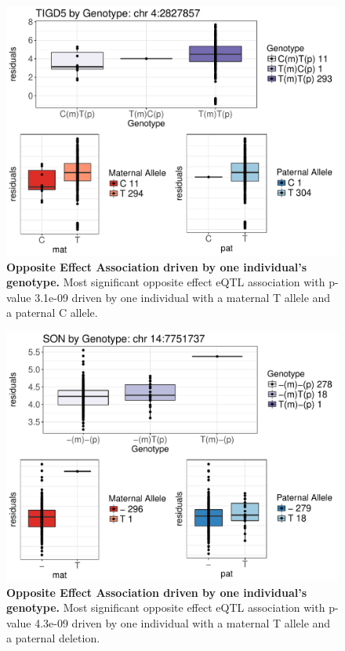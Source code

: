 \begin{figure}[!htb]
\centering \includegraphics[width=6in]{img/ch04/fig-01-oeQTL.pdf}
\caption[Opposite Effect Association driven by one individual's genotype.]{\textbf{Opposite Effect Association driven by one individual's genotype.} Most significant opposite effect eQTL association with p-value 3.1e-09 driven by one individual with a maternal T allele and a paternal C allele.}
\label{fig:oeQTL}
\end{figure}
\clearpage

\begin{figure}[!htb]
\centering \includegraphics[width=6in]{img/ch04/fig-02-oeQTL.pdf}
\caption[Opposite Effect Association driven by one individual's genotype.]{\textbf{Opposite Effect Association driven by one individual's genotype.} Most significant opposite effect eQTL association with p-value 4.3e-09 driven by one individual with a maternal T allele and a paternal deletion.}
\label{fig:oeQTL2}
\end{figure}
\clearpage

